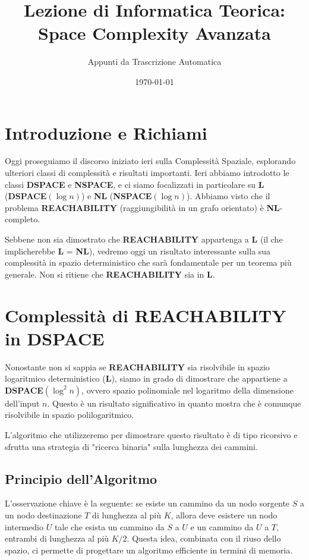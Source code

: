 \documentclass[a4paper]{article}
\title{Lezione di Informatica Teorica: Space Complexity Avanzata}
\author{Appunti da Trascrizione Automatica}
\date{\today}
\begin{document}
\maketitle
\tableofcontents
\newpage

\section{Introduzione e Richiami}
Oggi proseguiamo il discorso iniziato ieri sulla Complessità Spaziale, esplorando ulteriori classi di complessità e risultati importanti. Ieri abbiamo introdotto le classi \textbf{DSPACE} e \textbf{NSPACE}, e ci siamo focalizzati in particolare su \textbf{L} (\textbf{DSPACE}$(\log n)$) e \textbf{NL} (\textbf{NSPACE}$(\log n)$). Abbiamo visto che il problema \textbf{REACHABILITY} (raggiungibilità in un grafo orientato) è \textbf{NL}-completo.

Sebbene non sia dimostrato che \textbf{REACHABILITY} appartenga a \textbf{L} (il che implicherebbe \textbf{L} = \textbf{NL}), vedremo oggi un risultato interessante sulla sua complessità in spazio deterministico che sarà fondamentale per un teorema più generale. Non si ritiene che \textbf{REACHABILITY} sia in \textbf{L}.

\section{Complessità di REACHABILITY in DSPACE}
Nonostante non si sappia se \textbf{REACHABILITY} sia risolvibile in spazio logaritmico deterministico (\textbf{L}), siamo in grado di dimostrare che appartiene a \textbf{DSPACE}$(\log^2 n)$, ovvero spazio polinomiale nel logaritmo della dimensione dell'input $n$. Questo è un risultato significativo in quanto mostra che è comunque risolvibile in spazio polilogaritmico.

L'algoritmo che utilizzeremo per dimostrare questo risultato è di tipo ricorsivo e sfrutta una strategia di "ricerca binaria" sulla lunghezza dei cammini.

\subsection{Principio dell'Algoritmo}
L'osservazione chiave è la seguente: se esiste un cammino da un nodo sorgente $S$ a un nodo destinazione $T$ di lunghezza al più $K$, allora deve esistere un nodo intermedio $U$ tale che esista un cammino da $S$ a $U$ e un cammino da $U$ a $T$, entrambi di lunghezza al più $K/2$. Questa idea, combinata con il riuso dello spazio, ci permette di progettare un algoritmo efficiente in termini di memoria.
\end{document}
